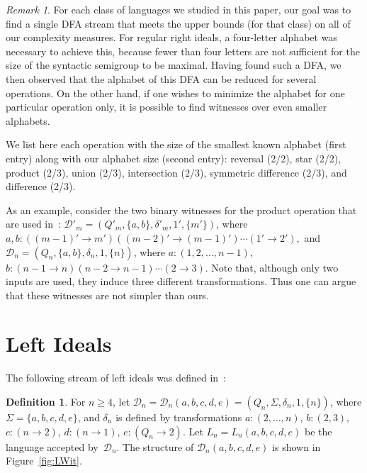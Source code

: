 \documentclass[final]{dmtcs-episciences}
\renewcommand{\ge}{\geqslant}
\newcommand{\Sig}{\Sigma}
\newcommand{\cD}{{\mathcal D}}
\theoremstyle{definition}
\newtheorem{definition}{Definition}
\theoremstyle{remark}
\newtheorem{remark}{Remark}
\begin{document}
\begin{remark}
For each class of languages we studied in this paper, our goal was to find a single DFA stream that meets the upper bounds (for that class) on all of our complexity measures.
For regular right ideals, a four-letter alphabet was necessary to achieve this, because fewer than four letters are not sufficient for the size of the syntactic semigroup to be maximal. Having found such a DFA, we then observed that the alphabet of this DFA can be reduced for several operations. On the other hand, if one wishes to minimize the alphabet for one particular operation only, it is possible to find witnesses over even smaller alphabets. 

We list here each operation with the size of the smallest known alphabet (first entry) along with our alphabet size (second entry):
reversal (2/2), star (2/2), product (2/3), union (2/3), intersection (2/3), symmetric difference (2/3), and difference (2/3).

As an example, consider the two binary witnesses for the product operation that are used in~\cite{BJL13}: 
$\cD'_m=(Q'_m,\{a,b\},\delta'_m, 1', \{m'\})$, 
where 
$a,b \colon ((m-1)' \to m')((m-2)' \to (m-1)') \cdots (1' \to 2'),$
and 
$\cD_n=(Q_n,\{a,b\},\delta_n, 1, \{n\})$, 
where 
$ a\colon (1,2,\dots, n-1)$, $b \colon (n-1 \to n)(n-2 \to n-1) \cdots (2 \to 3).$
Note that, although only two inputs are used, they induce three different transformations. 
Thus one can argue that these witnesses are not simpler than ours.
\end{remark}



\section{Left Ideals}

The following stream of left ideals was  defined in~\cite{BrYe11}:

\begin{definition}
\label{def:LWit}
For $n\ge 4$, let $\cD_n=\cD_n(a,b,c,d,e)=(Q_n,\Sig,\delta_n, 1, \{n\})$, where 
$\Sig=\{a,b,c,d,e\}$,
and $\delta_n$ is defined by  transformations
$a\colon (2,\dots,n)$,
$b\colon(2,3)$,
${c\colon(n \to 2)}$,
${d\colon(n\to 1)}$, 
$e\colon (Q_n\to 2)$.
Let $L_n=L_n(a,b,c,d,e)$ be the language accepted by~$\cD_n$.
The structure of  $\cD_n(a,b,c,d,e)$ is shown in Figure~\ref{fig:LWit}. 
\end{definition}
\end{document}
